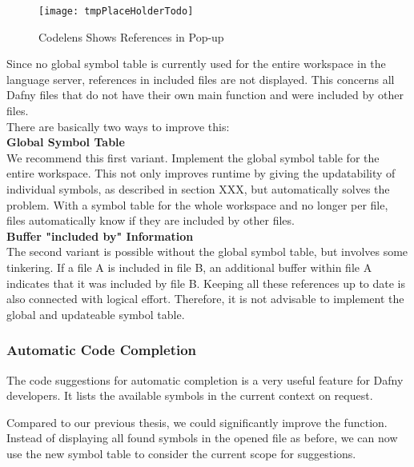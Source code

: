\begin{figure}[H]
    \centering
    \texttt{[image: tmpPlaceHolderTodo]}
    \caption{Codelens Shows References in Pop-up}
    \label{fig:result_codelens_references_popup}
\end{figure}

Since no global symbol table is currently used for the entire workspace in the language server,
references in included files are not displayed.
This concerns all Dafny files that do not have their own main function and were included by other files. \\

There are basically two ways to improve this: \\

\textbf{Global Symbol Table}\\
We recommend this first variant.
Implement the global symbol table for the entire workspace.
This not only improves runtime by giving the updatability of individual symbols,
as described in section XXX, but automatically solves the problem.
With a symbol table for the whole workspace and no longer per file,
files automatically know if they are included by other files. \\

\textbf{Buffer "included by" Information}\\
The second variant is possible without the global symbol table, but involves some tinkering.
If a file A is included in file B, an additional buffer within file A indicates that it was included by file B.
Keeping all these references up to date is also connected with logical effort.
Therefore, it is not advisable to implement the global and updateable symbol table.


\subsubsection{Automatic Code Completion}
The code suggestions for automatic completion is a very useful feature for Dafny developers.
It lists the available symbols in the current context on request.

Compared to our previous thesis, we could significantly improve the function.
Instead of displaying all found symbols in the opened file as before,
we can now use the new symbol table to consider the current scope for suggestions. \\

